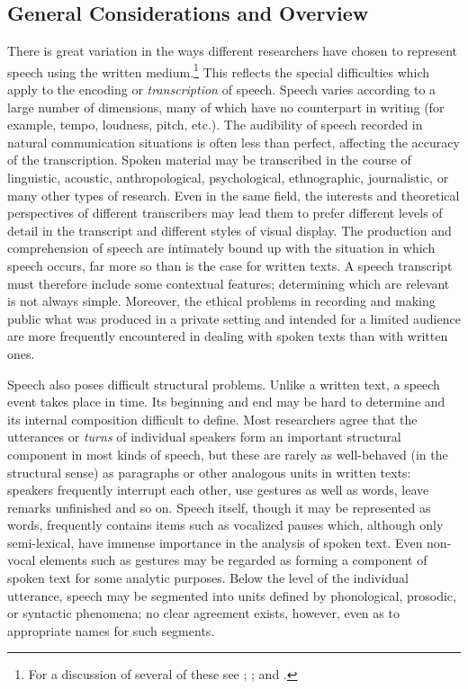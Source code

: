 \subsection[{General Considerations and Overview}]{General Considerations and Overview}\label{TSOV}\par
There is great variation in the ways different researchers have chosen to represent speech using the written medium.\footnote{For a discussion of several of these see \cite{TS-BIBL-1}; \cite{TS-BIBL-2}; and \cite{TS-BIBL-3}.} This reflects the special difficulties which apply to the encoding or \textit{transcription} of speech. Speech varies according to a large number of dimensions, many of which have no counterpart in writing (for example, tempo, loudness, pitch, etc.). The audibility of speech recorded in natural communication situations is often less than perfect, affecting the accuracy of the transcription. Spoken material may be transcribed in the course of linguistic, acoustic, anthropological, psychological, ethnographic, journalistic, or many other types of research. Even in the same field, the interests and theoretical perspectives of different transcribers may lead them to prefer different levels of detail in the transcript and different styles of visual display. The production and comprehension of speech are intimately bound up with the situation in which speech occurs, far more so than is the case for written texts. A speech transcript must therefore include some contextual features; determining which are relevant is not always simple. Moreover, the ethical problems in recording and making public what was produced in a private setting and intended for a limited audience are more frequently encountered in dealing with spoken texts than with written ones.\par
Speech also poses difficult structural problems. Unlike a written text, a speech event takes place in time. Its beginning and end may be hard to determine and its internal composition difficult to define. Most researchers agree that the utterances or \textit{turns} of individual speakers form an important structural component in most kinds of speech, but these are rarely as well-behaved (in the structural sense) as paragraphs or other analogous units in written texts: speakers frequently interrupt each other, use gestures as well as words, leave remarks unfinished and so on. Speech itself, though it may be represented as words, frequently contains items such as vocalized pauses which, although only semi-lexical, have immense importance in the analysis of spoken text. Even non-vocal elements such as gestures may be regarded as forming a component of spoken text for some analytic purposes. Below the level of the individual utterance, speech may be segmented into units defined by phonological, prosodic, or syntactic phenomena; no clear agreement exists, however, even as to appropriate names for such segments.\par
